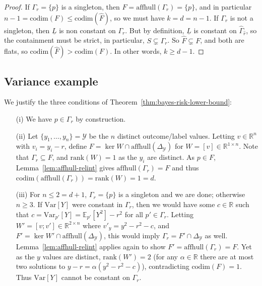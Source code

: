 \documentclass[anon,12pt]{colt2021} %
\newcommand{\reals}{\mathbb{R}}
\newcommand{\simplex}{\Delta_\Y}
\newcommand{\rank}{\mathrm{rank}}
\newcommand{\codim}{\mathrm{codim}}
\newcommand{\affhull}{\mathrm{affhull}}
\newcommand{\E}{\mathbb{E}}
\newcommand{\Y}{\mathcal{Y}}
\newcommand{\lbar}{\underline{L}} %
\newcommand{\Var}{\mathrm{Var}}
\begin{document}
\begin{proof}
	If $\Gamma_r = \{p\}$ is a singleton, then $F = \affhull(\Gamma_r) = \{p\}$, and in particular $n-1 = \codim(F) \leq \codim(\hat F)$, so we must have $k=d=n-1$.
	If $\Gamma_r$ is not a singleton, then $\lbar$ is non constant on $\Gamma_r$.
	But by definition, $\lbar$ is constant on $\hat \Gamma_{\hat r}$, so the containment must be strict, in particular, $S \subsetneq \Gamma_r$.
	So $\hat F \subsetneq F$, and both are flats, so $\codim(\hat{F}) > \codim(F)$.
	In other words, $k \geq d-1$.	
\end{proof}

\subsection{Variance example}
\label{app:variance-example}
We justify the three conditions of Theorem~\ref{thm:bayes-risk-lower-bound}:
\begin{enumerate}
\item[(i)]
  We have $p\in\Gamma_r$ by construction.
\item[(ii)]
  Let $\{y_1,\ldots,y_n\} = \Y$ be the $n$ distinct outcome/label values.
  Letting $v\in\reals^n$ with $v_i = y_i - r$, define $F = \ker W \cap \affhull(\simplex)$ for $W = [v]\in\reals^{1\times n}$.
  Note that $\Gamma_r \subseteq F$, and $\rank(W) = 1$ as the $y_i$ are distinct.
  As $p\in F$, Lemma~\ref{lem:affhull-relint} gives $\affhull(\Gamma_r) = F$ and thus $\codim(\affhull(\Gamma_r)) = \rank(W) = 1 = d$.
\item[(iii)]
  For $n \leq 2 = d+1$, $\Gamma_r=\{p\}$ is a singleton and we are done; otherwise $n\geq 3$.
  If $\Var[Y]$ were constant in $\Gamma_r$, then we would have some $c\in\reals$ such that $c = \Var_{p'}[Y] = \E_{p'} [Y^2] - r^2$ for all $p'\in\Gamma_r$.
  Letting $W' = [v;v']\in\reals^{2\times n}$ where $v'_y = y^2-r^2-c$, and $F' = \ker W' \cap \affhull(\simplex)$, this would imply $\Gamma_r = F'\cap\simplex$ as well.
  Lemma~\ref{lem:affhull-relint} applies again to show $F' = \affhull(\Gamma_r) = F$.
  Yet as the $y$ values are distinct, $\rank(W')=2$ (for any $\alpha\in\reals$ there are at most two solutions to $y-r = \alpha(y^2-r^2-c)$), contradicting $\codim(F) = 1$.
  Thus $\Var[Y]$ cannot be constant on $\Gamma_r$.
\end{enumerate}
\end{document}
